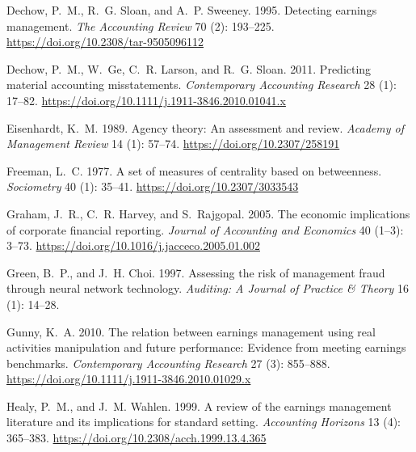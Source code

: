 \documentclass[12pt]{article}
\begin{document}
\begin{thebibliography}{}
Dechow, P.~M., R.~G. Sloan, and A.~P. Sweeney. 1995.
\newblock Detecting earnings management.
\newblock \textit{The Accounting Review} 70 (2): 193--225.
  \url{https://doi.org/10.2308/tar-9505096112}

Dechow, P.~M., W.~Ge, C.~R. Larson, and R.~G. Sloan. 2011.
\newblock Predicting material accounting misstatements.
\newblock \textit{Contemporary Accounting Research} 28 (1): 17--82.
  \url{https://doi.org/10.1111/j.1911-3846.2010.01041.x}

Eisenhardt, K.~M. 1989.
\newblock Agency theory: An assessment and review.
\newblock \textit{Academy of Management Review} 14 (1): 57--74.
  \url{https://doi.org/10.2307/258191}

Freeman, L.~C. 1977.
\newblock A set of measures of centrality based on betweenness.
\newblock \textit{Sociometry} 40 (1): 35--41.
  \url{https://doi.org/10.2307/3033543}

Graham, J.~R., C.~R. Harvey, and S.~Rajgopal. 2005.
\newblock The economic implications of corporate financial reporting.
\newblock \textit{Journal of Accounting and Economics} 40 (1--3): 3--73.
  \url{https://doi.org/10.1016/j.jacceco.2005.01.002}

Green, B.~P., and J.~H. Choi. 1997.
\newblock Assessing the risk of management fraud through neural network
  technology.
\newblock \textit{Auditing: A Journal of Practice \& Theory} 16 (1): 14--28.

Gunny, K.~A. 2010.
\newblock The relation between earnings management using real activities
  manipulation and future performance: Evidence from meeting earnings
  benchmarks.
\newblock \textit{Contemporary Accounting Research} 27 (3): 855--888.
  \url{https://doi.org/10.1111/j.1911-3846.2010.01029.x}

Healy, P.~M., and J.~M. Wahlen. 1999.
\newblock A review of the earnings management literature and its implications
  for standard setting.
\newblock \textit{Accounting Horizons} 13 (4): 365--383.
  \url{https://doi.org/10.2308/acch.1999.13.4.365}


\end{thebibliography}
\end{document}
